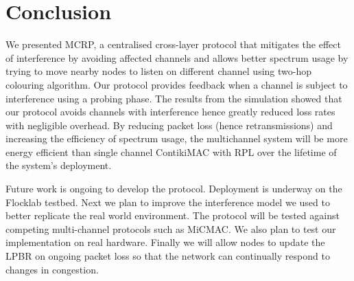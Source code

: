 \section{Conclusion}
\label{sec:conclusion}
We presented MCRP, a centralised cross-layer protocol that mitigates the effect of interference by avoiding affected channels and allows better spectrum usage by trying to move nearby nodes to listen on different channel using two-hop colouring algorithm. Our protocol provides feedback when a channel is subject to interference using a probing phase.
The results from the simulation showed that our protocol avoids channels with interference hence greatly reduced loss rates with negligible overhead. By reducing packet loss (hence retransmissions) and increasing the efficiency of spectrum usage, the multichannel system will be more energy efficient than single channel ContikiMAC with RPL over the lifetime of the system's deployment.

Future work is ongoing to develop the protocol. Deployment is underway on the Flocklab testbed\cite{flocklab}. Next we plan to improve the interference model we used to better replicate the real world environment. The protocol will be tested against competing multi-channel protocols such as MiCMAC. We also plan to test our implementation on real hardware.  Finally we will allow nodes to update the LPBR on ongoing packet loss so that the network can continually respond to changes in congestion.

